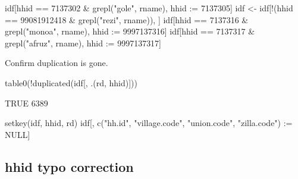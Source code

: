 \begin{Schunk}
\begin{Sinput}
idf[hhid == 7137302 & grepl("gole", rname), hhid := 7137305]
idf <- idf[!(hhid == 99081912418 & grepl("rezi", rname)), ]
idf[hhid == 7137316 & grepl("monoa", rname), hhid := 9997137316]
idf[hhid == 7137317 & grepl("afruz", rname), hhid := 9997137317]
\end{Sinput}
\end{Schunk}
Confirm duplication is gone.
\begin{Schunk}
\begin{Sinput}
table0(!duplicated(idf[, .(rd, hhid)]))
\end{Sinput}
\begin{Soutput}
TRUE 
6389 
\end{Soutput}
\begin{Sinput}
setkey(idf, hhid, rd)
idf[, c("hh.id", "village.code", "union.code", "zilla.code") := NULL]
\end{Sinput}
\end{Schunk}

\subsection{hhid typo correction}


